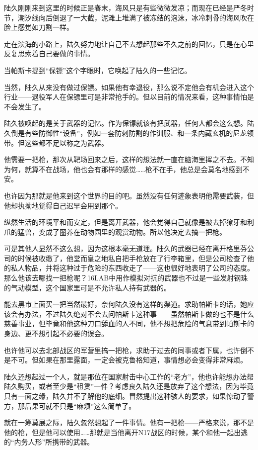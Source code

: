 陆久刚刚来到这里的时候正是春末，海风只是有些微微发凉；而现在已经是严冬时节，潮汐线向后倒退了一大截，泥滩上堆满了被冻结的泡沫，冰冷刺骨的海风吹在脸上感觉如刀割一样。

走在滨海的小路上，陆久努力地让自己不去想起那些不久之前的回忆，只是在心里反复思索着自己要做的事情。

当帕斯卡提到“保镖”这个字眼时，它唤起了陆久的一些记忆。

当然，陆久从来没有做过保镖。如果他有幸退役，那么说不定他会有机会进入这个行业——退役军人在保镖里可是非常抢手的。但以目前的情况来看，这种事情怕是不会发生了。

陆久被唤起的是关于武器的记忆。作为保镖就该有把武器，任何人都会这么想。陆久倒是有些防御性“设备”，例如一套防刺防割的作训服、和一条内藏玄机的尼龙领带。但这些都不足以称之为武器。

他需要一把枪，那次从靶场回来之后，这样的想法就一直在脑海里挥之不去。不知为何，就算不在战场，他也会有那样的感觉……枪不在手，他总是会莫名地感到不安。

也许因为那就是他来到这个世界的目的吧。虽然没有任何迹象表明他需要武装，但他却执拗地觉得自己迟早会用到那个。

纵然生活的环境平和而安定，但是离开武器，他会觉得自己就像是被去掉獠牙和利爪的猛兽，变成了圈养在动物园里的观赏动物。所以他决定去搞一把枪。

可是其他人显然不这么想，因为这根本毫无道理。陆久的武器已经在离开格里芬公司的时候被收缴了，他堂而皇之地私自把手枪放在了行李箱里，但是公司检查了他的私人物品，并将这种过于危险的东西收走了——这也很好地表明了公司的态度。那么他该去哪找一把枪呢？16LAB中用作模拟对抗的武器也不过是一些发射钢珠的气动模型，这个国家里可是不允许私人持有武器的。 

能去黑市上面买一把当然最好，奈何陆久没有这样的渠道。求助帕斯卡的话，她应该会有办法，不过陆久绝对不会去问帕斯卡这种事——虽然帕斯卡做的也不是什么慈善事业，但毕竟和他这种刀口舔血的人不同，他不想把危险的气息带到帕斯卡的身边、更不想引起不必要的误会。

也许他可以去北部战区的军营里搞一把枪，求助于过去的同事或者下属，也许倒不是不可。但如果在那里露面，一定会被克鲁格知道，事情想必会变得非常麻烦。

陆久还想起过一个人，就是那位在国家射击中心工作的“老方”，他也许能想办法帮陆久购买，或者至少是“租赁”一件？考虑良久陆久还是放弃了这个想法，因为毕竟只有一面之缘，陆久并不了解他的底细。冒然提出这种骇人的要求，如果惊动了警方，那后果可就不只是“麻烦”这么简单了。

就在一筹莫展之际，陆久忽然想起了一件事情。他有一把枪——严格来说，那不是他的枪，但是他可以使用……那就是当他离开N17战区的时候，某个和他一起出逃的“内务人形”所携带的武器。

